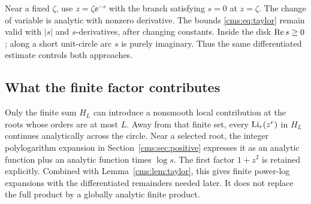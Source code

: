 Near a fixed $\zeta$, use $z=\zeta\ee^{-s}$ with the branch satisfying $s=0$ at $z=\zeta$. The change of variable is analytic with nonzero derivative. The bounds \eqref{cms:eq:taylor} remain valid with $|s|$ and $s$-derivatives, after changing constants. Inside the disk $\operatorname{Re} s\geq0$; along a short unit-circle arc $s$ is purely imaginary. Thus the same differentiated estimate controls both approaches.

\subsection{What the finite factor contributes}
Only the finite sum $H_L$ can introduce a nonsmooth local contribution at the roots whose orders are at most $L$. Away from that finite set, every $\operatorname{Li}_r(z^r)$ in $H_L$ continues analytically across the circle. Near a selected root, the integer polylogarithm expansion in Section~\ref{cms:sec:positive} expresses it as an analytic function plus an analytic function times $\log s$. The first factor $1+z^2$ is retained explicitly. Combined with Lemma~\ref{cms:lem:taylor}, this gives finite power-log expansions with the differentiated remainders needed later. It does not replace the full product by a globally analytic finite product.

